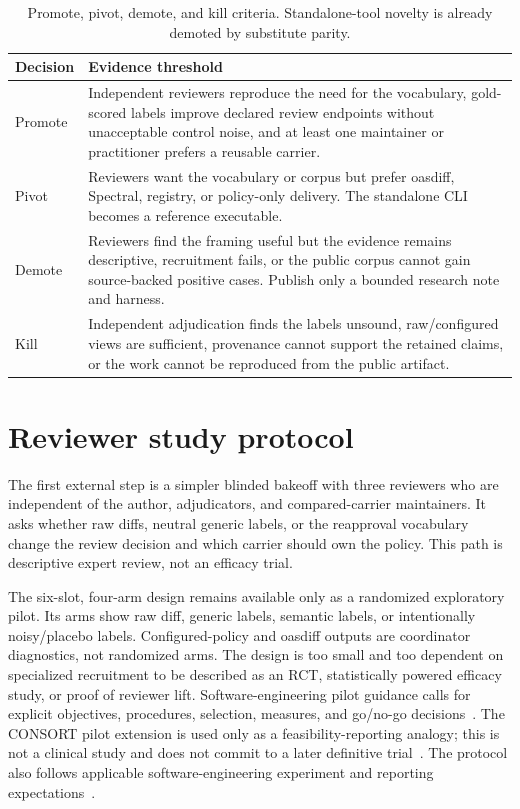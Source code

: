 \documentclass[11pt,letterpaper]{article}
\begin{document}
\begin{table}[H]
\centering
\small
\begin{tabularx}{\textwidth}{>{\raggedright\arraybackslash}p{}Y}
\toprule
\textbf{Decision} & \textbf{Evidence threshold} \\
\midrule
Promote & Independent reviewers reproduce the need for the vocabulary, gold-scored labels improve declared review endpoints without unacceptable control noise, and at least one maintainer or practitioner prefers a reusable carrier. \\
Pivot & Reviewers want the vocabulary or corpus but prefer oasdiff, Spectral, registry, or policy-only delivery. The standalone CLI becomes a reference executable. \\
Demote & Reviewers find the framing useful but the evidence remains descriptive, recruitment fails, or the public corpus cannot gain source-backed positive cases. Publish only a bounded research note and harness. \\
Kill & Independent adjudication finds the labels unsound, raw/configured views are sufficient, provenance cannot support the retained claims, or the work cannot be reproduced from the public artifact. \\
\bottomrule
\end{tabularx}
\caption{Promote, pivot, demote, and kill criteria. Standalone-tool novelty is already demoted by substitute parity.}
\end{table}

\section{Reviewer study protocol}

The first external step is a simpler blinded bakeoff with three reviewers who are independent of the author, adjudicators, and compared-carrier maintainers. It asks whether raw diffs, neutral generic labels, or the reapproval vocabulary change the review decision and which carrier should own the policy. This path is descriptive expert review, not an efficacy trial.

The six-slot, four-arm design remains available only as a randomized exploratory pilot. Its arms show raw diff, generic labels, semantic labels, or intentionally noisy/placebo labels. Configured-policy and oasdiff outputs are coordinator diagnostics, not randomized arms. The design is too small and too dependent on specialized recruitment to be described as an RCT, statistically powered efficacy study, or proof of reviewer lift. Software-engineering pilot guidance calls for explicit objectives, procedures, selection, measures, and go/no-go decisions~\cite{glass-pilot}. The CONSORT pilot extension is used only as a feasibility-reporting analogy; this is not a clinical study and does not commit to a later definitive trial~\cite{eldridge-pilot}. The protocol also follows applicable software-engineering experiment and reporting expectations~\cite{ralph-empirical,sigsoft-experiment}.
\end{document}
